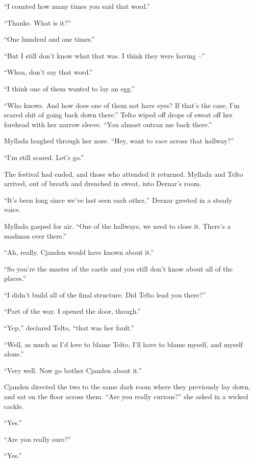 ``I counted how many times you said that word.''

``Thanks. What is it?''

``One hundred and one times.''

``But I still don't know what that was. I think they were having --''

``Whoa, don't say that word.''

``I think one of them wanted to lay an egg.''

``Who knows. And how does one of them not have eyes? If that's the case, I'm scared shit of going back down there.'' Telto wiped off drops of sweat off her forehead with her narrow sleeve. ``You almost outran me back there.''

Myllada laughed through her nose. ``Hey, want to race across that hallway?''

``I'm still scared. Let's go.''

\centeredstars

The festival had ended, and those who attended it returned. Myllada and Telto arrived, out of breath and drenched in sweat, into Dernar's room.

``It's been long since we've last seen each other,'' Dernar greeted in a steady voice.

Myllada gasped for air. ``One of the hallways, we need to close it. There's a madman over there.''

``Ah, really. Cjanden would have known about it.''

``So you're the master of the castle and you still don't know about all of the places.''

``I didn't build all of the final structure. Did Telto lead you there?''

``Part of the way. I opened the door, though.''

``Yep,'' declared Telto, ``that was her fault.''

``Well, as much as I'd love to blame Telto, I'll have to blame myself, and myself alone.''

``Very well. Now go bother Cjanden about it.''

\centeredstars

Cjanden directed the two to the same dark room where they previously lay down, and sat on the floor across them. ``Are you really curious?'' she asked in a wicked cackle.

``Yes.''

``Are you really sure?''

``Yes.''

